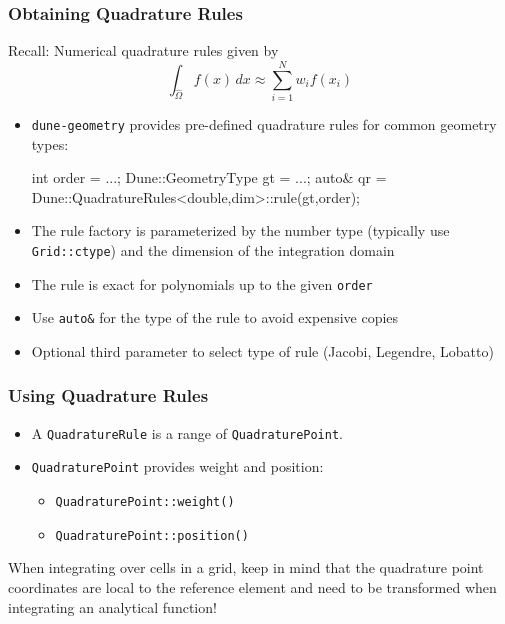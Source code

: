 \documentclass[aspectratio=169,11pt]{beamer}
\theoremstyle{definition}
\newcommand{\diffd}{\,d}
\begin{document}
\begin{frame}[fragile]
  \frametitle{Obtaining Quadrature Rules}
  Recall: Numerical quadrature rules given by
  \begin{equation*}
    \int_{\hat\Omega} f(x) \diffd x \approx \sum_{i = 1}^N w_i f(x_i)
  \end{equation*}

  \begin{itemize}
  \item \lstinline!dune-geometry! provides pre-defined quadrature rules for common geometry types:
\begin{cppcode}
int order = ...;
Dune::GeometryType gt = ...;
auto& qr = Dune::QuadratureRules<double,dim>::rule(gt,order);
\end{cppcode}
\item The rule factory is parameterized by the number type (typically use \lstinline!Grid::ctype!) and the dimension of the
  integration domain
\item The rule is exact for polynomials up to the given \lstinline!order!
\item Use \lstinline!auto&! for the type of the rule to avoid expensive copies
\item Optional third parameter to select type of rule (Jacobi, Legendre, Lobatto)
  \end{itemize}

\end{frame}

\begin{frame}[fragile]
  \frametitle{Using Quadrature Rules}
  \begin{itemize}
  \item A \lstinline!QuadratureRule! is a range of
    \lstinline!QuadraturePoint!.
  \item \lstinline!QuadraturePoint! provides weight and position:
    \begin{itemize}
    \item \lstinline!QuadraturePoint::weight()!
    \item \lstinline!QuadraturePoint::position()!
    \end{itemize}
  \end{itemize}
  \pause
   \pause {} When integrating over cells in a grid, keep in mind that the quadrature
point coordinates are local to the reference element and need to be transformed when integrating an analytical function!
\end{frame}
\end{document}
